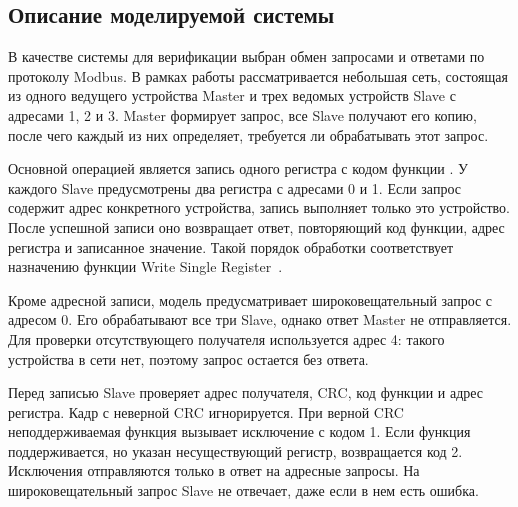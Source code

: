 \subsection{Описание моделируемой системы}

В качестве системы для верификации выбран обмен запросами и ответами
по протоколу Modbus. В рамках работы рассматривается небольшая сеть,
состоящая из одного ведущего устройства Master и трех ведомых устройств
Slave с адресами 1, 2 и 3. Master формирует запрос, все Slave получают
его копию, после чего каждый из них определяет, требуется ли обрабатывать
этот запрос.

Основной операцией является запись одного регистра с кодом функции
. У каждого Slave предусмотрены два регистра с адресами 0 и 1.
Если запрос содержит адрес конкретного устройства, запись выполняет только
это устройство. После успешной записи оно возвращает ответ, повторяющий
код функции, адрес регистра и записанное значение. Такой порядок обработки
соответствует назначению функции Write Single Register~\cite{modbus}.

Кроме адресной записи, модель предусматривает широковещательный запрос
с адресом 0. Его обрабатывают все три Slave, однако ответ Master
не отправляется. Для проверки отсутствующего получателя используется
адрес 4: такого устройства в сети нет, поэтому запрос остается без ответа.

Перед записью Slave проверяет адрес получателя, CRC, код функции и адрес
регистра. Кадр с неверной CRC игнорируется. При верной CRC неподдерживаемая
функция вызывает исключение с кодом 1. Если функция поддерживается, но
указан несуществующий регистр, возвращается код 2. Исключения отправляются только в ответ на адресные
запросы. На широковещательный запрос Slave не отвечает, даже если в нем
есть ошибка.


